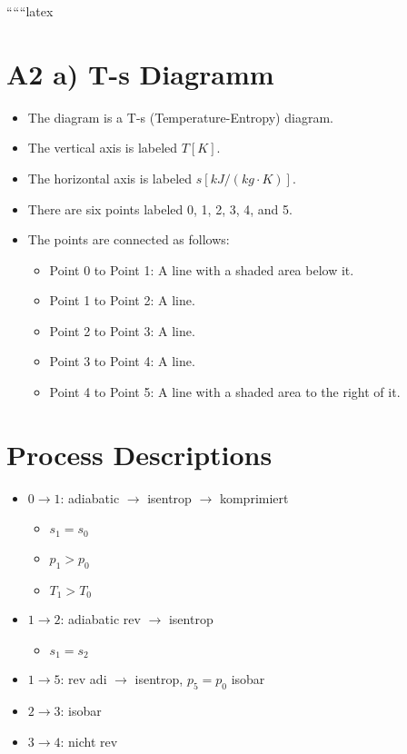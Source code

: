 
``````latex


\section*{A2 a) T-s Diagramm}

\begin{itemize}
    \item The diagram is a T-s (Temperature-Entropy) diagram.
    \item The vertical axis is labeled $T [K]$.
    \item The horizontal axis is labeled $s [kJ/(kg \cdot K)]$.
    \item There are six points labeled 0, 1, 2, 3, 4, and 5.
    \item The points are connected as follows:
    \begin{itemize}
        \item Point 0 to Point 1: A line with a shaded area below it.
        \item Point 1 to Point 2: A line.
        \item Point 2 to Point 3: A line.
        \item Point 3 to Point 4: A line.
        \item Point 4 to Point 5: A line with a shaded area to the right of it.
    \end{itemize}
\end{itemize}

\section*{Process Descriptions}

\begin{itemize}
    \item $0 \rightarrow 1$: adiabatic $\rightarrow$ isentrop $\rightarrow$ komprimiert
    \begin{itemize}
        \item $s_1 = s_0$
        \item $p_1 > p_0$
        \item $T_1 > T_0$
    \end{itemize}
    \item $1 \rightarrow 2$: adiabatic rev $\rightarrow$ isentrop
    \begin{itemize}
        \item $s_1 = s_2$
    \end{itemize}
    \item $1 \rightarrow 5$: rev adi $\rightarrow$ isentrop, $p_5 = p_0$ isobar
    \item $2 \rightarrow 3$: isobar
    \item $3 \rightarrow 4$: nicht rev
\end{itemize}

